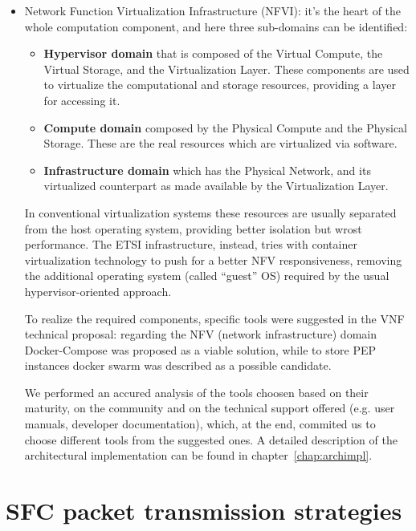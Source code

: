\documentclass[10pt]{book}
\begin{document}
\begin{itemize}
 \item Network Function Virtualization Infrastructure (NFVI): it's the heart of 
the whole computation component, and here three sub-domains can be identified:
\begin{itemize} 
 \item \textbf{Hypervisor domain} that is composed of the Virtual Compute, the 
Virtual Storage, and the Virtualization Layer. These components are used to 
virtualize the computational and storage resources, providing a layer for 
accessing it.
 \item \textbf{Compute domain} composed by the Physical Compute and the 
Physical Storage. These are the real resources which are virtualized via 
software.
 \item \textbf{Infrastructure domain} which has the Physical Network, and its 
virtualized counterpart as made available by the Virtualization Layer.
\end{itemize}

In conventional virtualization systems these resources are usually separated
from the host operating system, providing better isolation but wrost
performance. The ETSI infrastructure, instead, tries with container
virtualization technology to push for a better NFV responsiveness, removing the additional operating
system (called ``guest'' OS) required by the usual hypervisor-oriented approach.

To realize the required components, specific tools were suggested in the VNF 
technical proposal: regarding the NFV (network infrastructure) domain 
Docker-Compose was proposed as a viable solution, while to store PEP instances 
docker swarm was described as a possible candidate.

We performed an accured analysis of the tools choosen based on their maturity, 
on the community and on the technical support offered (e.g. user manuals, 
developer documentation), which, at the end, commited us to choose different 
tools from the suggested ones. A detailed description of the architectural 
implementation can be found in chapter~\ref{chap:archimpl}.

\end{itemize}


\section{SFC packet transmission strategies}
\end{document}
